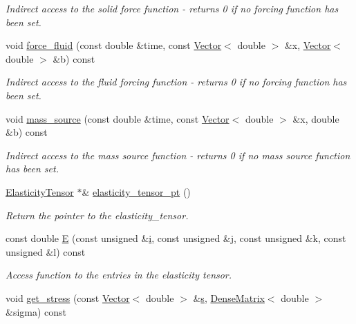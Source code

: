 \begin{DoxyCompactItemize}
\begin{DoxyCompactList}\small\item\em Indirect access to the solid force function -\/ returns 0 if no forcing function has been set. \end{DoxyCompactList}\item 
void \hyperlink{classoomph_1_1PoroelasticityEquations_aae946ee5e9f6190e34cd1ca1b2c98971}{force\+\_\+fluid} (const double \&time, const \hyperlink{classoomph_1_1Vector}{Vector}$<$ double $>$ \&x, \hyperlink{classoomph_1_1Vector}{Vector}$<$ double $>$ \&b) const
\begin{DoxyCompactList}\small\item\em Indirect access to the fluid forcing function -\/ returns 0 if no forcing function has been set. \end{DoxyCompactList}\item 
void \hyperlink{classoomph_1_1PoroelasticityEquations_a316fd839c477c5d4619c894d51c221cd}{mass\+\_\+source} (const double \&time, const \hyperlink{classoomph_1_1Vector}{Vector}$<$ double $>$ \&x, double \&b) const
\begin{DoxyCompactList}\small\item\em Indirect access to the mass source function -\/ returns 0 if no mass source function has been set. \end{DoxyCompactList}\item 
\hyperlink{classoomph_1_1ElasticityTensor}{Elasticity\+Tensor} $\ast$\& \hyperlink{classoomph_1_1PoroelasticityEquations_a88a5a2beb7f2c3c8909fb09020199af9}{elasticity\+\_\+tensor\+\_\+pt} ()
\begin{DoxyCompactList}\small\item\em Return the pointer to the elasticity\+\_\+tensor. \end{DoxyCompactList}\item 
const double \hyperlink{classoomph_1_1PoroelasticityEquations_ae40523d3812bc6c50ab5c23fd9359cad}{E} (const unsigned \&\hyperlink{cfortran_8h_adb50e893b86b3e55e751a42eab3cba82}{i}, const unsigned \&j, const unsigned \&k, const unsigned \&l) const
\begin{DoxyCompactList}\small\item\em Access function to the entries in the elasticity tensor. \end{DoxyCompactList}\item 
void \hyperlink{classoomph_1_1PoroelasticityEquations_a4f8cb984e4afa174beca76989299f256}{get\+\_\+stress} (const \hyperlink{classoomph_1_1Vector}{Vector}$<$ double $>$ \&\hyperlink{cfortran_8h_ab7123126e4885ef647dd9c6e3807a21c}{s}, \hyperlink{classoomph_1_1DenseMatrix}{Dense\+Matrix}$<$ double $>$ \&sigma) const

\end{DoxyCompactItemize}
